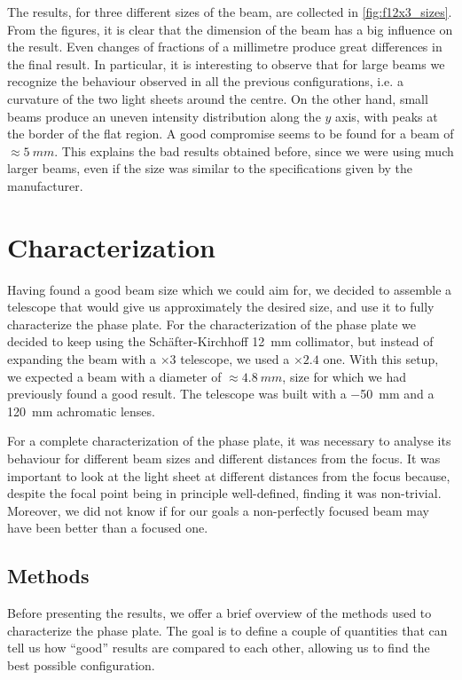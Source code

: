 The results, for three different sizes of the beam, are collected in \cref{fig:f12x3_sizes}. From the figures, it is clear that the dimension of the beam has a big influence on the result. Even changes of fractions of a millimetre produce great differences in the final result. In particular, it is interesting to observe that for large beams we recognize the behaviour observed in all the previous configurations, i.e. a curvature of the two light sheets around the centre. On the other hand, small beams produce an uneven intensity distribution along the $y$ axis, with peaks at the border of the flat region. A good compromise seems to be found for a beam of $\approx \SI{5}{mm}$. This explains the bad results obtained before, since we were using much larger beams, even if the size was similar to the specifications given by the manufacturer.

\section{Characterization}
\label{sec:characterization}
Having found a good beam size which we could aim for, we decided to assemble a telescope that would give us approximately the desired size, and use it to fully characterize the phase plate. For the characterization of the phase plate we decided to keep using the Schäfter-Kirchhoff \SI{12}{mm} collimator, but instead of expanding the beam with a $\times3$ telescope, we used a $\times2.4$ one. With this setup, we expected a beam with a diameter of $\approx \SI{4.8}{mm}$, size for which we had previously found a good result. The telescope was built with a \SI{-50}{mm} and a \SI{120}{mm} achromatic lenses.

For a complete characterization of the phase plate, it was necessary to analyse its behaviour for different beam sizes and different distances from the focus. It was important to look at the light sheet at different distances from the focus because, despite the focal point being in principle well-defined, finding it was non-trivial. Moreover, we did not know if for our goals a non-perfectly focused beam may have been better than a focused one.

\subsection{Methods}
\label{sec:characterization_methods}
Before presenting the results, we offer a brief overview of the methods used to characterize the phase plate. The goal is to define a couple of quantities that can tell us how \enquote{good} results are compared to each other, allowing us to find the best possible configuration.

